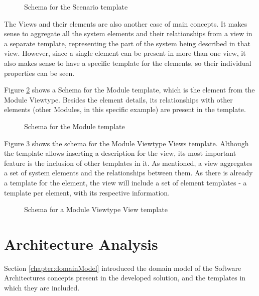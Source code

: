 \begin{figure}[h]
\centering

\caption{Schema for the Scenario template}
\label{figure:scenarioTemplate}
\end{figure}

The Views and their elements are also another case of main concepts. It makes sense to aggregate all the system elements and their relationships from a view in a separate template, representing the part of the system being described in that view. However, since a single element can be present in more than one view, it also makes sense to have a specific template for the elements, so their individual properties can be seen.

Figure \ref{figure:moduleTemplate} shows a Schema for the Module template, which is the element from the Module Viewtype. Besides the element details, its relationships with other elements (other Modules, in this specific example) are present in the template.

\begin{figure}[h]
\centering

\caption{Schema for the Module template}
\label{figure:moduleTemplate}
\end{figure}

Figure \ref{figure:viewTemplate} shows the schema for the Module Viewtype Views template. Although the template allows inserting a description for the view, its most important feature is the inclusion of other templates in it. As mentioned, a view aggregates a set of system elements and the relationships between them. As there is already a template for the element, the view will include a set of element templates - a template per element, with its respective information.

\begin{figure}[h]
\centering

\caption{Schema for a Module Viewtype View template}
\label{figure:viewTemplate}
\end{figure}


\section{Architecture Analysis}
\label{chapter:architecture}
Section \ref{chapter:domainModel} introduced the domain model of the Software Architectures concepts present in the developed solution, and the templates in which they are included.

